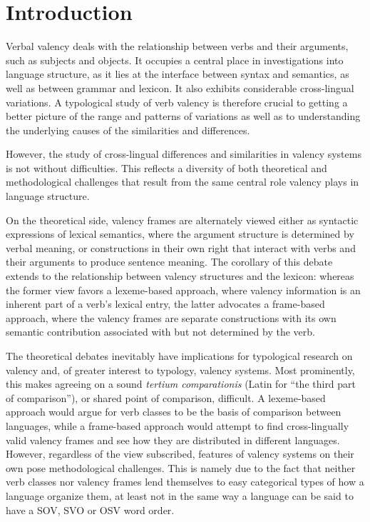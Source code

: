 \chapter{Introduction}\label{chapter:introduction}

Verbal valency deals with the relationship between verbs and their arguments, such as subjects and objects. It occupies a central place in investigations into language structure, as it lies at the interface between syntax and semantics, as well as between grammar and lexicon. It also exhibits considerable cross-lingual variations. A typological study of verb valency is therefore crucial to getting a better picture of the range and patterns of variations as well as to understanding the underlying causes of the similarities and differences.

However, the study of cross-lingual differences and similarities in valency systems is not without difficulties. This reflects a diversity of both theoretical and methodological challenges that result from the same central role valency plays in language structure. 

On the theoretical side, valency frames are alternately viewed either as syntactic expressions of lexical semantics, where the argument structure is determined by verbal meaning, or constructions in their own right that interact with verbs and their arguments to produce sentence meaning. The corollary of this debate extends to the relationship between valency structures and the lexicon: whereas the former view favors a lexeme-based approach, where valency information is an inherent part of a verb's lexical entry, the latter advocates a frame-based approach, where the valency frames are separate constructions with its own semantic contribution associated with but not determined by the verb.

The theoretical debates inevitably have implications for typological research on valency and, of greater interest to typology, valency systems. Most prominently, this makes agreeing on a sound \textit{tertium comparationis} (Latin for ``the third part of comparison''), or shared point of comparison, difficult. A lexeme-based approach would argue for verb classes to be the basis of comparison between languages, while a frame-based approach would attempt to find cross-lingually valid valency frames and see how they are distributed in different languages. However, regardless of the view subscribed, features of valency systems on their own pose methodological challenges. This is namely due to the fact that neither verb classes nor valency frames lend themselves to easy categorical types of how a language organize them, at least not in the same way a language can be said to have a SOV, SVO or OSV word order. 

